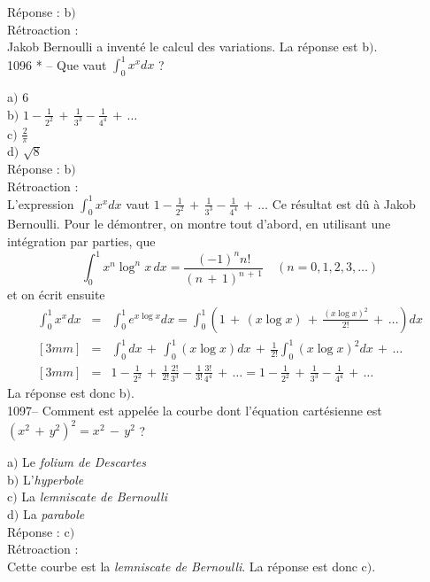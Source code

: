 ﻿\documentclass[letterpaper, 12pt]{article}
\begin{document}
R\'eponse : b$)$\\

R\'etroaction : \\
Jakob Bernoulli a invent\'e le calcul des variations.
La r\'eponse est b$)$.\\

1096 * -- Que vaut $\int_0^1x^xdx$ ?

a$)$ $6$ \\ [2mm] b$)$
$1-\frac1{2^2}\,+\,\frac1{3^3}-\frac1{4^4}\,+\,\ldots$ \\ [3 mm]
c$)$ $\frac2{\pi}$  \\ [2mm]
d$)$ $\sqrt8$\\

R\'eponse : b$)$\\

R\'etroaction : \\
L'expression $\int_0^1x^xdx$ vaut
$1-\frac1{2^2}\,+\,\frac1{3^3}-\frac1{4^4}\,+\,\ldots$ Ce r\'esultat
est d\^u \`a Jakob Bernoulli. Pour le d\'emontrer, on montre tout
d'abord, en utilisant une int\'egration par parties, que
$$\displaystyle{\int_0^1x^n\log^nx\,dx=\frac{(-1)^nn!}{(n\,+\,1)^{n\,+\,1}}\quad(n=0,1,2,3,\ldots)}$$
et on \'ecrit ensuite
\begin{eqnarray*}
\int_0^1x^xdx & = & \displaystyle{\int_0^1e^{x\log
x}dx=\int_0^1\left(1\,+\,(x\log x)\,+\,\frac{(x\log
x)^2}{2!}\,+\,\ldots\right)dx} \\ [3mm]
              & = & \displaystyle{\int_0^1dx\,+\,\int_0^1(x\log
x)dx\,+\,\frac1{2!}\int_0^1(x\log x)^2dx\,+\,\ldots} \\ [3mm]
              & = &
\displaystyle{1-\frac1{2^2}\,+\,\frac1{2!}\frac{2!}{3^3}-\frac1{3!}\frac{3!}{4^4}\,+\,\ldots=1-\frac1{2^2}\,+\,\frac1{3^3}-\frac1{4^4}\,+\,\ldots}
\end{eqnarray*}
La r\'eponse est donc b$)$.\\

1097-- Comment est appel\'ee la courbe dont l'\'equation
cart\'esienne est $(x^2\,+\,y^2)^2=x^2\,-\,y^2$ ?

a$)$ Le {\sl folium de Descartes} \\
b$)$ L'{\sl hyperbole}  \\
c$)$ La {\sl lemniscate de Bernoulli}  \\
d$)$ La {\sl parabole}\\

R\'eponse : c$)$\\

R\'etroaction : \\
Cette courbe est la {\sl lemniscate de Bernoulli}.
La r\'eponse est donc c$)$.\\
\end{document}
